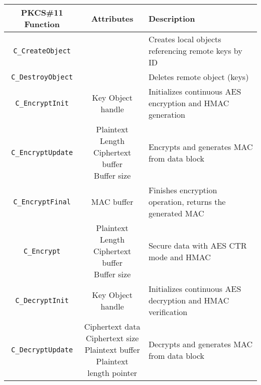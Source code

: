 \begin{table}[]
\centering
\def\arraystretch{1.5}
	\begin{tabular}{|c|c|l|}
	\hline
	\textbf{PKCS\#11 Function} & \textbf{Attributes} & \textbf{Description} \\ \hline
	\texttt{C\_CreateObject}	& & Creates local objects referencing remote keys by ID \\ \hline
	\texttt{C\_DestroyObject}	& & Deletes remote object (keys)\\ \hline
	\texttt{C\_EncryptInit}		& Key Object handle & Initializes continuous AES encryption and HMAC generation \\ \hline
	\texttt{C\_EncryptUpdate}	& \makecell{Plaintext\\Length\\Ciphertext buffer\\Buffer size} & Encrypts and generates MAC from data block \\ \hline
	\texttt{C\_EncryptFinal}	& MAC buffer & Finishes encryption operation, returns the generated MAC\\ \hline
	\texttt{C\_Encrypt}		& \makecell{Plaintext\\Length\\Ciphertext buffer\\Buffer size} & Secure data with AES CTR mode and HMAC\\ \hline
	\texttt{C\_DecryptInit}		& Key Object handle & Initializes continuous AES decryption and HMAC verification\\ \hline
	\texttt{C\_DecryptUpdate}	& \makecell{Ciphertext data\\Ciphertext size\\Plaintext buffer\\Plaintext length pointer} & Decrypts and generates MAC from data block\\ \hline

\end{tabular}
\end{table}
